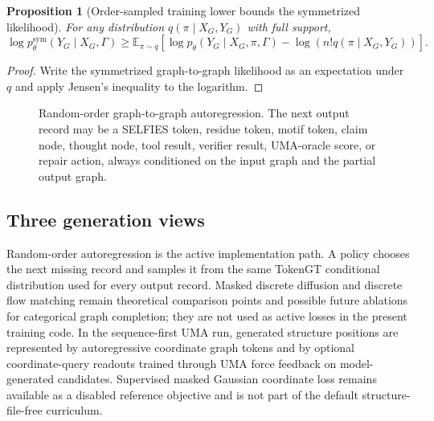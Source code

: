 \documentclass[11pt]{article}
\newtheorem{proposition}[definition]{Proposition}
\newcommand{\E}{\mathbb{E}}
\newcommand{\1}{\mathbf{1}}
\begin{document}
\begin{proposition}[Order-sampled training lower bounds the symmetrized likelihood]
For any distribution $q(\pi\mid X_G,Y_G)$ with full support,
\[
\log p_\theta^{\mathrm{sym}}(Y_G\mid X_G,\Gamma)\geq
\E_{\pi\sim q}\left[\log p_\theta(Y_G\mid X_G,\pi,\Gamma)-\log(n!q(\pi\mid X_G,Y_G))\right].
\]
\end{proposition}
\begin{proof}
Write the symmetrized graph-to-graph likelihood as an expectation under $q$ and apply Jensen's inequality to the logarithm.\end{proof}

\begin{figure}[H]
\centering
{}
\caption{Random-order graph-to-graph autoregression. The next output record may be a SELFIES token, residue token, motif token, claim node, thought node, tool result, verifier result, UMA-oracle score, or repair action, always conditioned on the input graph and the partial output graph.}
\label{fig:random}
\end{figure}

\subsection{Three generation views}

Random-order autoregression is the active implementation path. A policy chooses the next missing record and samples it from the same TokenGT conditional distribution used for every output record. Masked discrete diffusion and discrete flow matching remain theoretical comparison points and possible future ablations for categorical graph completion; they are not used as active losses in the present training code. In the sequence-first UMA run, generated structure positions are represented by autoregressive coordinate graph tokens and by optional coordinate-query readouts trained through UMA force feedback on model-generated candidates. Supervised masked Gaussian coordinate loss remains available as a disabled reference objective and is not part of the default structure-file-free curriculum.
\end{document}
